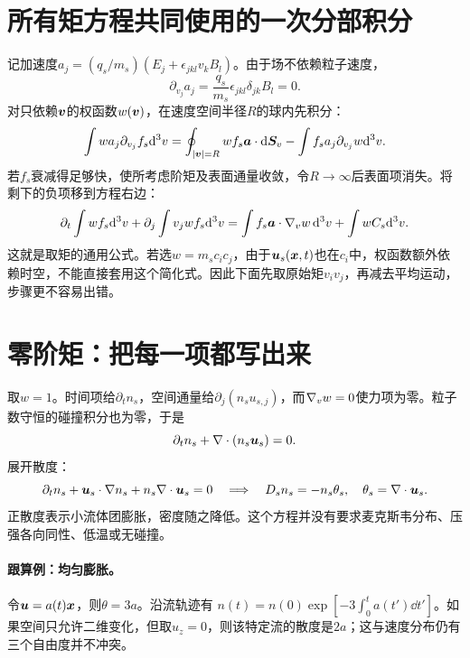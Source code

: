 \section{所有矩方程共同使用的一次分部积分}
记加速度$a_j=(q_s/m_s)(E_j+\epsilon_{jkl}v_kB_l)$。由于场不依赖粒子速度，
\begin{equation}
 \partial_{v_j}a_j=\frac{q_s}{m_s}\epsilon_{jkl}\delta_{jk}B_l=0.
\end{equation}
对只依赖$\bm{v}$的权函数$w(\bm{v})$，在速度空间半径$R$的球内先积分：
\begin{equation}
 \int w a_j\partial_{v_j}f_s\mathrm d^3v
 =\oint_{|\bm{v}|=R}w f_s\bm{a}\cdot\mathrm d\bm{S}_v
 -\int f_s a_j\partial_{v_j}w\mathrm d^3v.
\end{equation}
若$f_s$衰减得足够快，使所考虑阶矩及表面通量收敛，令$R\to\infty$后表面项消失。将剩下的负项移到方程右边：
\begin{equation}
 \partial_t\int wf_s\mathrm d^3v+\partial_j\int v_jwf_s\mathrm d^3v
 =\int f_s\bm{a}\cdot\nabla_vw\,\mathrm d^3v+\int wC_s\mathrm d^3v.
 \label{hall:eq:tutorial-mastermoment}
\end{equation}
这就是取矩的通用公式。若选$w=m_sc_ic_j$，由于$\bm{u}_s(\bm{x},t)$也在$c_i$中，权函数额外依赖时空，不能直接套用这个简化式。因此下面先取原始矩$v_iv_j$，再减去平均运动，步骤更不容易出错。

\section{零阶矩：把每一项都写出来}
取$w=1$。时间项给$\partial_t n_s$，空间通量给$\partial_j(n_su_{s,j})$，而$\nabla_vw=0$使力项为零。粒子数守恒的碰撞积分也为零，于是
\begin{equation}
 \partial_tn_s+\nabla\cdot(n_s\bm{u}_s)=0.
 \label{hall:eq:continuity}
\end{equation}
展开散度：
\begin{equation}
 \partial_t n_s+\bm{u}_s\cdot\nabla n_s+n_s\nabla\cdot\bm{u}_s=0
 \quad\Longrightarrow\quad
 D_sn_s=-n_s\theta_s,\quad\theta_s=\nabla\cdot\bm{u}_s.
\end{equation}
正散度表示小流体团膨胀，密度随之降低。这个方程并没有要求麦克斯韦分布、压强各向同性、低温或无碰撞。

\paragraph{跟算例：均匀膨胀。}
令$\bm{u}=a(t)\bm{x}$，则$\theta=3a$。沿流轨迹有
$n(t)=n(0)\exp[-3\int_0^ta(t')\dd t']$。如果空间只允许二维变化，但取$u_z=0$，则该特定流的散度是$2a$；这与速度分布仍有三个自由度并不冲突。

